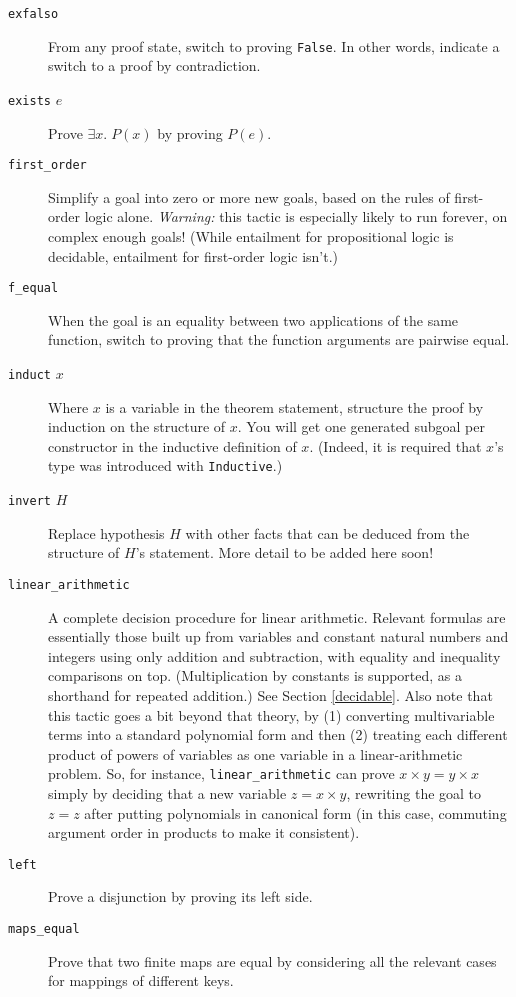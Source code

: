 \documentclass{amsbook}
\theoremstyle{definition}
\theoremstyle{remark}
\numberwithin{section}{chapter}
\numberwithin{equation}{chapter}
\begin{document}
\begin{description}
  \item[\texttt{exfalso}] From any proof state, switch to proving \texttt{False}.  In other words, indicate a switch to a proof by contradiction.
  \item[\texttt{exists} $e$] Prove $\exists x. \; P(x)$ by proving $P(e)$.
  \item[\texttt{first\_order}] Simplify a goal into zero or more new goals, based on the rules of first-order logic alone.  \emph{Warning:} this tactic is especially likely to run forever, on complex enough goals!  (While entailment for propositional logic is decidable, entailment for first-order logic isn't.)
  \item[\texttt{f\_equal}] When the goal is an equality between two applications of the same function, switch to proving that the function arguments are pairwise equal.
  \item[\texttt{induct} $x$] Where $x$ is a variable in the theorem statement, structure the proof by induction on the structure of $x$.  You will get one generated subgoal per constructor in the inductive definition of $x$.  (Indeed, it is required that $x$'s type was introduced with \texttt{Inductive}.)
  \item[\texttt{invert} $H$] Replace hypothesis $H$ with other facts that can be deduced from the structure of $H$'s statement.  More detail to be added here soon!
  \item[\texttt{linear\_arithmetic}] A complete decision procedure for linear arithmetic.  Relevant formulas are essentially those built up from variables and constant natural numbers and integers using only addition and subtraction, with equality and inequality comparisons on top.  (Multiplication by constants is supported, as a shorthand for repeated addition.) See Section \ref{decidable}.  Also note that this tactic goes a bit beyond that theory, by (1) converting multivariable terms into a standard polynomial form and then (2) treating each different product of powers of variables as one variable in a linear-arithmetic problem.  So, for instance, \texttt{linear\_arithmetic} can prove $x \times y = y \times x$ simply by deciding that a new variable $z = x \times y$, rewriting the goal to $z = z$ after putting polynomials in canonical form (in this case, commuting argument order in products to make it consistent).
  \item[\texttt{left}] Prove a disjunction by proving its left side.
  \item[\texttt{maps\_equal}] Prove that two finite maps are equal by considering all the relevant cases for mappings of different keys.

\end{description}
\end{document}
